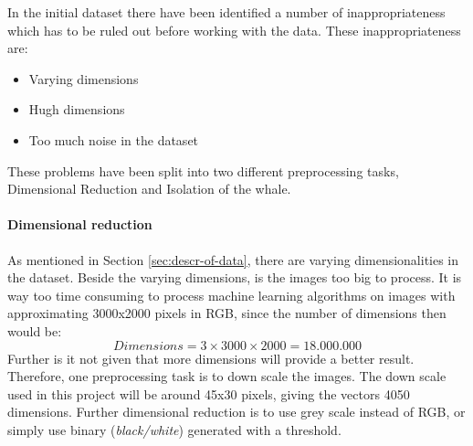 In the initial dataset there have been identified a number of inappropriateness which has to be ruled out before working with the data.
These inappropriateness are:
\begin{itemize}
\item Varying dimensions
\item Hugh dimensions
\item Too much noise in the dataset
\end{itemize}
These problems have been split into two different preprocessing tasks, Dimensional Reduction and Isolation of the whale.

\paragraph{Dimensional reduction}
As mentioned in Section \ref{sec:descr-of-data}, there are varying dimensionalities in the dataset. Beside the varying dimensions, is the images too big to process. It is way too time consuming to process machine learning algorithms on images with approximating 3000x2000 pixels in RGB, since the number of dimensions then would be:
\begin{equation}
Dimensions = 3 \times 3000 \times 2000=18.000.000
\end{equation} 
Further is it not given that more dimensions will provide a better result.
Therefore, one preprocessing task is to down scale the images.
The down scale used in this project will be around 45x30 pixels, giving the vectors 4050 dimensions.
Further dimensional reduction is to use grey scale instead of RGB, or simply use binary (\emph{black/white}) generated with a threshold.

